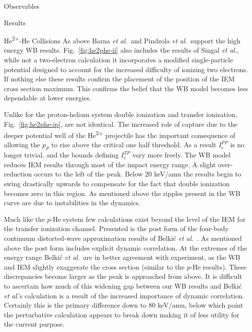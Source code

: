 \documentclass[letterpaper, 11 pt]{report}
\begin{document}
\begin{chapter}{Observables \label{chap:p-he2p-he}}
\begin{section}{Results \label{sec:phe2p-res}}
\begin{subsection}{\texorpdfstring{He\textsuperscript{2+}}{He2+}-He Collisions 
                         \label{sec:he2phe-res}}
         As above Barna \textit{et al}.\ and Pindzola \textit{et al}.\ support the high energy WB
         results. Fig.~\ref{fig:he2phe-ii} also includes the results of Singal \textit{et al}., while
         not a two-electron calculation it incorporates a modified single-particle potential designed to
         account for the increased difficulty of ionizing two electrons. If nothing else these results
         confirm the placement of the position of the IEM cross section maximum. This confirms the
         belief that the WB model becomes less dependable at lower energies.

         Unlike for the proton-helium system double ionization and transfer ionization,
         Fig.~\ref{fig:he2phe-ip}, are not identical. The increased role of capture due to the deeper
         potential well of the He\textsuperscript{2+} projectile has the important consequence of
         allowing the $p_P$ to rise above the critical one half threshold. As a result
         $I^{PP}_\mathrm{c}$ is no longer trivial, and the bounds defining $I^{TP}_\mathrm{c}$ vary more
         freely. The WB model reduces IEM results through most of the impact energy range. A slight
         over-reduction occurs to the left of the peak. Below 20 keV/amu the results begin to swing
         drastically upwards to compensate for the fact that double ionization becomes zero in this
         region. As mentioned above the ripples present in the WB curve are due to instabilities in the
         dynamics.

         Much like the $p$-He system few calculations exist beyond the level of the IEM for the transfer
         ionization channel. Presented is the post form of the four-body continuum distorted-wave 
         approximation results of Belki\'{c} \textit{et al}.~\cite{BMM-97}. As mentioned above the post
         form includes explicit dynamic correlation. At the extremes of the energy range Belki\'{c}
         \textit{et al}.\ are in better agreement with experiment, as the WB and IEM slightly exaggerate
         the cross section (similar to the $p$-He results). These discrepancies become larger as the
         peak is approached from above. It is difficult to ascertain how much of this widening gap
         between our WB results and Belki\'{c} \textit{et al}.'s calculation is a result of the
         increased importance of dynamic correlation. Certainly this is the primary difference down to
         80 keV/amu, below which point the perturbative calculation appears to break down making it of
         less utility for the current purpose.
         

\end{subsection}
\end{section}
\end{chapter}
\end{document}
